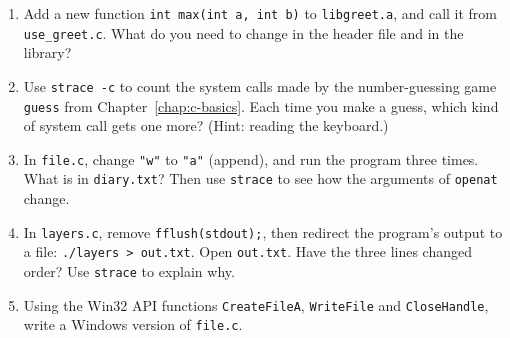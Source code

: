 \begin{enumerate}
  \item Add a new function \texttt{int max(int a, int b)} to \texttt{libgreet.a}, and call it from \texttt{use\_greet.c}. What do you need to change in the header file and in the library?
  \item Use \texttt{strace -c} to count the system calls made by the number-guessing game \texttt{guess} from Chapter~\ref{chap:c-basics}. Each time you make a guess, which kind of system call gets one more? (Hint: reading the keyboard.)
  \item In \texttt{file.c}, change \texttt{"w"} to \texttt{"a"} (append), and run the program three times. What is in \texttt{diary.txt}? Then use \texttt{strace} to see how the arguments of \texttt{openat} change.
  \item In \texttt{layers.c}, remove \texttt{fflush(stdout);}, then redirect the program's output to a file: \texttt{./layers > out.txt}. Open \texttt{out.txt}. Have the three lines changed order? Use \texttt{strace} to explain why.
  \item Using the Win32 API functions \texttt{CreateFileA}, \texttt{WriteFile} and \texttt{CloseHandle}, write a Windows version of \texttt{file.c}.
\end{enumerate}
